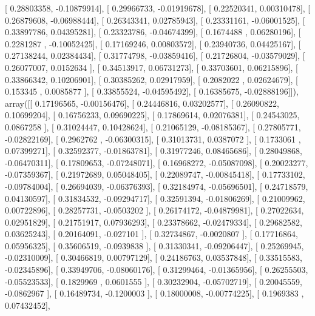 \documentclass{article}
\begin{document}
       [ 0.28803358, -0.10879914],
       [ 0.29966733, -0.01919678],
       [ 0.22520341,  0.00310478],
       [ 0.26879608, -0.06988444],
       [ 0.26343341,  0.02785943],
       [ 0.23331161, -0.06001525],
       [ 0.33897786,  0.04395281],
       [ 0.23323786, -0.04674399],
       [ 0.1674488 ,  0.06280196],
       [ 0.2281287 , -0.10052425],
       [ 0.17169246,  0.00803572],
       [ 0.23940736,  0.04425167],
       [ 0.27138244,  0.02384434],
       [ 0.31774798, -0.03859416],
       [ 0.21726804, -0.03579029],
       [ 0.26077007,  0.0152634 ],
       [ 0.34513917,  0.06731273],
       [ 0.33703601,  0.06215896],
       [ 0.33866342,  0.10206901],
       [ 0.30385262,  0.02917959],
       [ 0.2082022 ,  0.02624679],
       [ 0.153345  ,  0.0085877 ],
       [ 0.33855524, -0.04595492],
       [ 0.16385675, -0.02888196]]), array([[ 0.17196565, -0.00156476],
       [ 0.24446816,  0.03202577],
       [ 0.26090822,  0.10699204],
       [ 0.16756233,  0.09690225],
       [ 0.17869614,  0.02076381],
       [ 0.24543025,  0.0867258 ],
       [ 0.31024447,  0.10428624],
       [ 0.21065129, -0.08185367],
       [ 0.27805771, -0.02822169],
       [ 0.2962762 , -0.06300315],
       [ 0.31013731,  0.0387072 ],
       [ 0.1733061 ,  0.07399271],
       [ 0.32592377, -0.01863781],
       [ 0.31977246,  0.08465686],
       [ 0.28049868, -0.06470311],
       [ 0.17809653, -0.07248071],
       [ 0.16968272, -0.05087098],
       [ 0.20023277, -0.07359367],
       [ 0.21972689,  0.05048405],
       [ 0.22089747, -0.00845418],
       [ 0.17733102, -0.09784004],
       [ 0.26694039, -0.06376393],
       [ 0.32184974, -0.05696501],
       [ 0.24718579,  0.04130597],
       [ 0.31834532, -0.09294717],
       [ 0.32591394, -0.01806269],
       [ 0.21009962,  0.00722896],
       [ 0.28257731, -0.0503202 ],
       [ 0.26174172, -0.04879981],
       [ 0.27022634,  0.02951829],
       [ 0.21751917,  0.07936293],
       [ 0.23378662, -0.02479334],
       [ 0.29682582,  0.03625243],
       [ 0.20164091, -0.027101  ],
       [ 0.32734867, -0.0020807 ],
       [ 0.17716864,  0.05956325],
       [ 0.35606519, -0.0939838 ],
       [ 0.31330341, -0.09206447],
       [ 0.25269945, -0.02310009],
       [ 0.30466819,  0.00797129],
       [ 0.24186763,  0.03537848],
       [ 0.33515583, -0.02345896],
       [ 0.33949706, -0.08060176],
       [ 0.31299464, -0.01365956],
       [ 0.26255503, -0.05523533],
       [ 0.1829969 ,  0.0601555 ],
       [ 0.30232904, -0.05702719],
       [ 0.20045559, -0.0862967 ],
       [ 0.16489734, -0.1200003 ],
       [ 0.18000008, -0.00774225],
       [ 0.1969383 ,  0.07432452],
\end{document}
